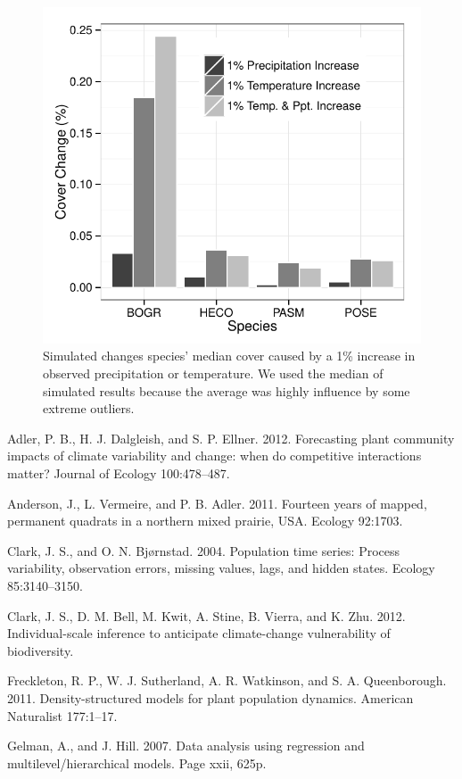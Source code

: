 \documentclass[12pt,]{article}
\begin{document}
\begin{figure}[htbp]
\centering
\includegraphics{components/figure/manuscript-figure_4.pdf}
\caption{Simulated changes species' median cover caused by a 1\%
increase in observed precipitation or temperature. We used the median of
simulated results because the average was highly influence by some
extreme outliers.}
\end{figure}

Adler, P. B., H. J. Dalgleish, and S. P. Ellner. 2012. Forecasting plant
community impacts of climate variability and change: when do competitive
interactions matter? Journal of Ecology 100:478--487.

Anderson, J., L. Vermeire, and P. B. Adler. 2011. Fourteen years of
mapped, permanent quadrats in a northern mixed prairie, USA. Ecology
92:1703.

Clark, J. S., and O. N. Bjørnstad. 2004. Population time series: Process
variability, observation errors, missing values, lags, and hidden
states. Ecology 85:3140--3150.

Clark, J. S., D. M. Bell, M. Kwit, A. Stine, B. Vierra, and K. Zhu.
2012. Individual-scale inference to anticipate climate-change
vulnerability of biodiversity.

Freckleton, R. P., W. J. Sutherland, A. R. Watkinson, and S. A.
Queenborough. 2011. Density-structured models for plant population
dynamics. American Naturalist 177:1--17.

Gelman, A., and J. Hill. 2007. Data analysis using regression and
multilevel/hierarchical models. Page xxii, 625p.
\end{document}
